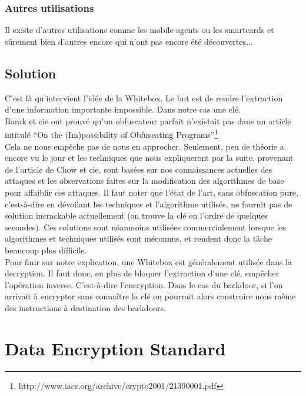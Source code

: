 \documentclass[a4paper,12pt]{article}
\begin{document}
\subsubsection{Autres utilisations}

Il existe d'autres utilisations comme les mobile-agents ou les smartcards et sûrement bien d'autres encore qui n'ont pas encore été découvertes...


\subsection{Solution}

C'est là qu'intervient l'idée de la Whitebox. Le but est de rendre l'extraction d'une information importante impossible. Dans notre cas une clé.\\
Barak et cie ont prouvé qu'un obfuscateur parfait n'existait pas dans un article intitulé ``On the (Im)possibility of Obfuscating Programs''\footnote{http://www.iacr.org/archive/crypto2001/21390001.pdf}\\
Cela ne nous empêche pas de nous en approcher. Seulement, peu de théorie a encore vu le jour et les techniques que nous expliqueront par la suite, provenant de l'article de Chow et cie, sont basées sur nos connaissances actuelles des attaques et les observations faites sur la modification des algorithmes de base pour affaiblir ces attaques. Il faut noter que l'état de l'art, sans obfuscation pure, c'est-à-dire en dévoilant les techniques et l'algorithme utilisés, ne fournit pas de solution incrackable actuellement (on trouve la clé en l'ordre de quelques secondes). Ces solutions sont néanmoins utilisées commercialement lorsque les algorithmes et techniques utilisés sont méconnus, et rendent donc la tâche beaucoup plus difficile.\\
Pour finir sur notre explication, une Whitebox est généralement utilisée dans la decryption. Il faut donc, en plus de bloquer l'extraction d'une clé, empêcher l'opération inverse. C'est-à-dire l'encryption. Dans le cas du backdoor, si l'on arrivait à encrypter sans connaître la clé on pourrait alors construire nous même des instructions à destination des backdoors.\\

\newpage
	
\section{Data Encryption Standard}
\end{document}
